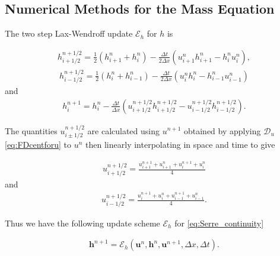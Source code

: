 \documentclass[times]{elsarticle}
\begin{document}
\subsection{Numerical Methods for the Mass Equation}
\label{section:}
The two step Lax-Wendroff update $\mathcal{E}_h$ for $h$ is
\begin{linenomath*}
	\begin{gather*}
	h^{n + 1/2}_{i+ 1/2} = \frac{1}{2}\left(h^{n}_{i+1} + h^{n}_i\right) - \frac{\Delta t}{2\Delta x}\left(u^n_{i+1}h^n_{i+1} - h^n_{i}u^n_{i}\right),
	\end{gather*}
	\begin{gather*}
	h^{n + 1/2}_{i- 1/2} = \frac{1}{2}\left(h^{n}_{i} + h^{n}_{i-1}\right) - \frac{\Delta t}{2\Delta x}\left(u^n_{i}h^n_{i} - h^n_{i-1}u^n_{i-1}\right)
	\end{gather*}
	and
	\begin{gather*}
	h^{n+1}_i = h^{n}_i - \frac{\Delta t}{\Delta x}\left(u^{n + 1/2}_{i+ 1/2}h^{n + 1/2}_{i+ 1/2} - u^{n + 1/2}_{i- 1/2}h^{n + 1/2}_{i- 1/2}\right).
	\label{eq:LW4h}
	\end{gather*}
\end{linenomath*}
The quantities $u^{n + 1/2}_{i \pm 1/2}$ are calculated using $u^{n+1}$ obtained by applying $\mathcal{D}_u$ \eqref{eq:FDcentforu} to $u^n$ then linearly interpolating in space and time to give
\begin{linenomath*}
	\begin{gather*}
	u^{n + 1/2}_{i+ 1/2} = \frac{u^{n+1}_{i+1} + u^{n}_{i+1} + u^{n+1}_{i} + u^{n}_{i} }{4}
	\end{gather*}
	and
	\begin{gather*}
	u^{n + 1/2}_{i- 1/2} = \frac{u^{n+1}_{i} + u^{n}_{i} + u^{n+1}_{i-1}+ u^{n}_{i-1} }{4}.
	\end{gather*}
\end{linenomath*}
Thus we have the following update scheme $\mathcal{E}_h$ for \eqref{eq:Serre_continuity}
\begin{linenomath*}
	\begin{gather}
	\boldsymbol{h}^{n+1} = \mathcal{E}_h\left(\boldsymbol{u}^n,\boldsymbol{h}^n,\boldsymbol{u}^{n+1}, \Delta x, \Delta t \right). 
	\label{eq:LWupdateh}
	\end{gather}
\end{linenomath*}
\end{document}
